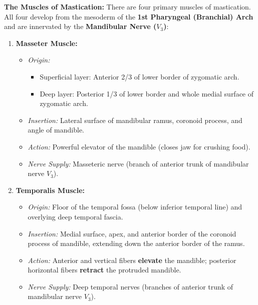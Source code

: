 \documentclass[11pt,a4paper]{article}
\begin{document}
\begin{ansbox}
\textbf{The Muscles of Mastication:}
There are four primary muscles of mastication. All four develop from the mesoderm of the \textbf{1st Pharyngeal (Branchial) Arch} and are innervated by the \textbf{Mandibular Nerve ($V_3$)}:

\begin{enumerate}[leftmargin=*]
    \item \textbf{Masseter Muscle:}
    \begin{itemize}
        \item \textit{Origin:}
        \begin{itemize}
            \item Superficial layer: Anterior 2/3 of lower border of zygomatic arch.
            \item Deep layer: Posterior 1/3 of lower border and whole medial surface of zygomatic arch.
        \end{itemize}
        \item \textit{Insertion:} Lateral surface of mandibular ramus, coronoid process, and angle of mandible.
        \item \textit{Action:} Powerful elevator of the mandible (closes jaw for crushing food).
        \item \textit{Nerve Supply:} Masseteric nerve (branch of anterior trunk of mandibular nerve $V_3$).
    \end{itemize}
    
    \item \textbf{Temporalis Muscle:}
    \begin{itemize}
        \item \textit{Origin:} Floor of the temporal fossa (below inferior temporal line) and overlying deep temporal fascia.
        \item \textit{Insertion:} Medial surface, apex, and anterior border of the coronoid process of mandible, extending down the anterior border of the ramus.
        \item \textit{Action:} Anterior and vertical fibers \textbf{elevate} the mandible; posterior horizontal fibers \textbf{retract} the protruded mandible.
        \item \textit{Nerve Supply:} Deep temporal nerves (branches of anterior trunk of mandibular nerve $V_3$).
    \end{itemize}


\end{enumerate}
\end{ansbox}
\end{document}
